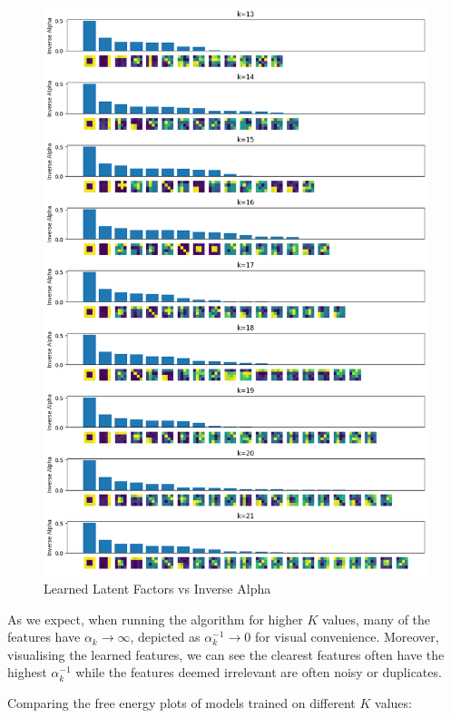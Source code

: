 \documentclass[12pt]{article}
\begin{document}
{\newpage
\begin{figure}[h]
\centering
\includegraphics[scale=0.47]{outputs/q4/b-2-latent-factors-comparison}
\caption{Learned Latent Factors vs Inverse Alpha}
\label{fig:}
\end{figure}
As we expect, when running the algorithm for higher $K$ values, many of the features have $\alpha_k \rightarrow \infty$, depicted as $\alpha^{-1}_k \rightarrow 0$ for visual convenience. Moreover, visualising the learned features, we can see the clearest features often have the highest $\alpha^{-1}_k$ while the features deemed irrelevant are often noisy or duplicates.


\newpage

Comparing the free energy plots of models trained on different $K$ values:


}
\end{document}
